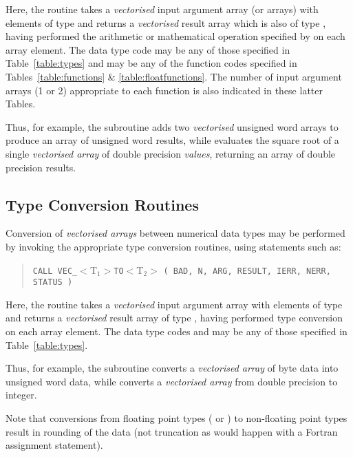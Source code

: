 Here, the  routine takes a {\em vectorised} input argument array
(or arrays) with  elements of type  and returns a {\em
vectorised} result array which is also of type , having performed
the arithmetic or mathematical operation specified by  on
each array element.
The data type code  may be any of those specified in
Table~\ref{table:types} and  may be any of the function
codes specified in Tables~\ref{table:functions} \&
\ref{table:floatfunctions}.
The number of input argument arrays (1 or 2) appropriate to each function is
also indicated in these latter Tables.

Thus, for example, the subroutine  adds two {\em vectorised}
unsigned word arrays to produce an array of unsigned word results, while
 evaluates the square root of a single {\em vectorised
array} of double precision {\em values}, returning an array of double
precision results.

\subsection{ Type Conversion Routines}

Conversion of {\em vectorised arrays} between numerical data types may be
performed by invoking the appropriate  type conversion routines,
using statements such as:

\begin{quote}
\verb#CALL VEC_#$<$T$_{1}>$\verb#TO#$<$T$_{2}>$
\verb#( BAD, N, ARG, RESULT, IERR, NERR, STATUS )#
\end{quote}

Here, the  routine takes a {\em vectorised} input argument array
with  elements of type  and returns a {\em
vectorised} result array of type , having performed type
conversion on each array element.
The data type codes  and  may be any of
those specified in Table~\ref{table:types}.

Thus, for example, the subroutine  converts a {\em
vectorised array} of byte data into unsigned word data, while
 converts a {\em vectorised array} from double precision to
integer.

Note that conversions from floating point types ( or
) to non-floating point types result in rounding of the data
(not truncation as would happen with a Fortran assignment statement).

